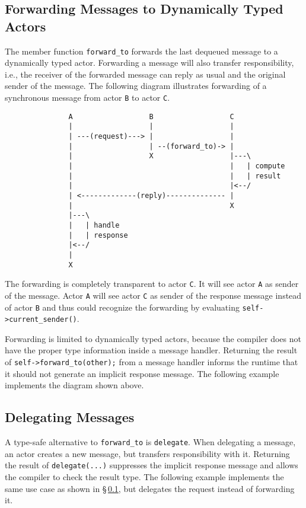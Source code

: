 \clearpage
\subsection{Forwarding Messages to Dynamically Typed Actors}
\label{forward}

The member function \lstinline^forward_to^ forwards the last dequeued message to a dynamically typed actor.
Forwarding a message will also transfer responsibility, i.e., the receiver of the forwarded message can reply as usual and the original sender of the message.
The following diagram illustrates forwarding of a synchronous message from actor \texttt{B} to actor \texttt{C}.

\begin{footnotesize}
\begin{verbatim}
               A                  B                  C
               |                  |                  |
               | ---(request)---> |                  |
               |                  | --(forward_to)-> |
               |                  X                  |---\
               |                                     |   | compute
               |                                     |   | result
               |                                     |<--/
               | <-------------(reply)-------------- |
               |                                     X
               |---\
               |   | handle
               |   | response
               |<--/
               |
               X
\end{verbatim}
\end{footnotesize}

The forwarding is completely transparent to actor \texttt{C}. It will see actor \texttt{A} as sender of the message.
Actor \texttt{A} will see actor \texttt{C} as sender of the response message instead of actor \texttt{B} and thus could recognize the forwarding by evaluating \lstinline^self->current_sender()^.

Forwarding is limited to dynamically typed actors, because the compiler does not have the proper type information inside a message handler. Returning the result of \lstinline^self->forward_to(other);^ from a message handler informs the runtime that it should not generate an implicit response message. The following example implements the diagram shown above.

\clearpage


\clearpage
\subsection{Delegating Messages}
\label{delegate}

A type-safe alternative to \lstinline^forward_to^ is \lstinline^delegate^.
When delegating a message, an actor creates a new message, but transfers responsibility with it.
Returning the result of \lstinline^delegate(...)^ suppresses the implicit response message and allows the compiler to check the result type.
The following example implements the same use case as shown in \S\,\ref{forward}, but delegates the request instead of forwarding it.


